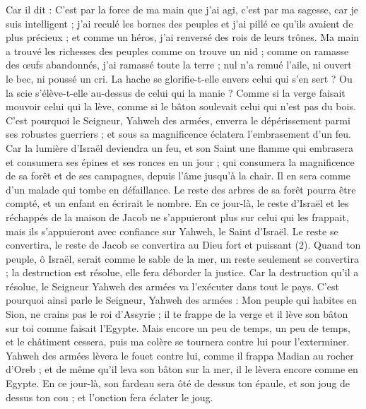 \begin{multicols}{2}
Car il dit : C’est par la force de ma main que j’ai agi, c’est par ma sagesse, car je suis intelligent ; j'ai reculé les bornes des peuples et j'ai pillé ce qu'ils avaient de plus précieux ; et comme un héros, j'ai renversé des rois de leurs trônes.
Ma main a trouvé les richesses des peuples comme on trouve un nid ; comme on ramasse des œufs abandonnés, j’ai ramassé toute la terre ; nul n’a remué l’aile, ni ouvert le bec, ni poussé un cri.
La hache se glorifie-t-elle envers celui qui s’en sert ? Ou la scie s’élève-t-elle au-dessus de celui qui la manie ? Comme si la verge faisait mouvoir celui qui la lève, comme si le bâton soulevait celui qui n’est pas du bois.
C'est pourquoi le Seigneur, Yahweh des armées, enverra le dépérissement parmi ses robustes guerriers ; et sous sa magnificence éclatera l’embrasement d’un feu.
Car la lumière d'Israël deviendra un feu, et son Saint une flamme qui embrasera et consumera ses épines et ses ronces en un jour ;
qui consumera la magnificence de sa forêt et de ses campagnes, depuis l'âme jusqu'à la chair. Il en sera comme d’un malade qui tombe en défaillance.
Le reste des arbres de sa forêt pourra être compté, et un enfant en écrirait le nombre.
En ce jour-là, le reste d'Israël et les réchappés de la maison de Jacob ne s'appuieront plus sur celui qui les frappait, mais ils s'appuieront avec confiance sur Yahweh, le Saint d'Israël.
Le reste se convertira, le reste de Jacob se convertira au Dieu fort et puissant (2).
Quand ton peuple, ô Israël, serait comme le sable de la mer, un reste seulement se convertira ; la destruction est résolue, elle fera déborder la justice.
Car la destruction qu’il a résolue, le Seigneur Yahweh des armées va l’exécuter dans tout le pays.
C'est pourquoi ainsi parle le Seigneur, Yahweh des armées : Mon peuple qui habites en Sion, ne crains pas le roi d'Assyrie ; il te frappe de la verge et il lève son bâton sur toi comme faisait l’Egypte.
Mais encore un peu de temps, un peu de temps, et le châtiment cessera, puis ma colère se tournera contre lui pour l’exterminer.
Yahweh des armées lèvera le fouet contre lui, comme il frappa Madian au rocher d'Oreb ; et de même qu’il leva son bâton sur la mer, il le lèvera encore comme en Egypte.
En ce jour-là, son fardeau sera ôté de dessus ton épaule, et son joug de dessus ton cou ; et l’onction fera éclater le joug.

\end{multicols}
